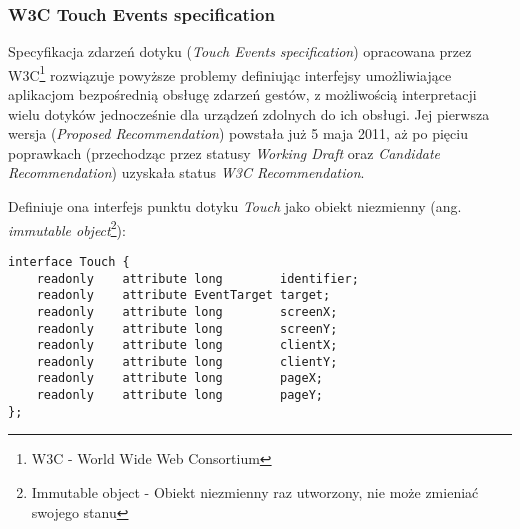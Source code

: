 \subsubsection{W3C Touch Events specification}

Specyfikacja zdarzeń dotyku (\emph{Touch Events specification}\cite{touch-events-w3c}) opracowana przez W3C\footnote{W3C - World Wide Web Consortium} rozwiązuje powyższe problemy definiując interfejsy umożliwiające aplikacjom bezpośrednią obsługę zdarzeń gestów, z możliwością interpretacji wielu dotyków jednocześnie dla urządzeń zdolnych do ich obsługi. Jej pierwsza wersja (\emph{Proposed Recommendation}) powstała już 5 maja 2011, aż po pięciu poprawkach (przechodząc przez statusy \emph{Working Draft} oraz \emph{Candidate Recommendation}) uzyskała status \emph{W3C Recommendation}.

Definiuje ona interfejs punktu dotyku \emph{Touch} jako obiekt niezmienny (ang. \emph{immutable object}\footnote{Immutable object - Obiekt niezmienny raz utworzony, nie może zmieniać swojego stanu}):

\lstset{language=Octave}
\begin{lstlisting}
interface Touch {
    readonly    attribute long        identifier;
    readonly    attribute EventTarget target;
    readonly    attribute long        screenX;
    readonly    attribute long        screenY;
    readonly    attribute long        clientX;
    readonly    attribute long        clientY;
    readonly    attribute long        pageX;
    readonly    attribute long        pageY;
};
\end{lstlisting}

